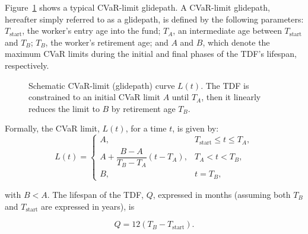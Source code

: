 \documentclass[11pt]{article}
\newcommand{\Tstart}{T_{\mathrm{start}}}
\newcommand{\TA}{T_{A}}
\newcommand{\TB}{T_{B}}
\begin{document}
Figure~\ref{fig:cvar-glidepath} shows a typical CVaR-limit glidepath. A CVaR-limit glidepath, hereafter simply referred to as a glidepath, is defined by the following parameters: $\Tstart$, the worker's entry age into the fund; $\TA$, an intermediate age between $\Tstart$ and $\TB$; $\TB$, the worker's retirement age; and $A$ and $B$, which denote the maximum CVaR limits during the initial and final phases of the TDF's lifespan, respectively.




\begin{figure}[H]
  \centering
  \caption{Schematic CVaR-limit (glidepath) curve   {$L(t)$}. The TDF is constrained to an  initial CVaR  limit $A$ until $\TA$, then it linearly reduces the limit to $B$ by retirement age $\TB$.}
  \label{fig:cvar-glidepath}
\end{figure}

Formally, the CVaR limit, $L(t)$, for a time  $t$, is given by:
\begin{equation}
L(t)=
\begin{cases}
A, & \Tstart \leq t \leq \TA, \\
A + \dfrac{B-A}{\TB-\TA}(t-\TA), & \TA < t < \TB, \\
B, & t = \TB,
\end{cases}
\label{eq:glidepath}
\end{equation}

with $B < A$.  The lifespan of the TDF, $Q$, expressed in months
(assuming both $T_B$ and $T_{\text{start}}$ are expressed in years), is



\begin{equation}
Q = 12    (\TB - \Tstart).
\end{equation}
\end{document}
